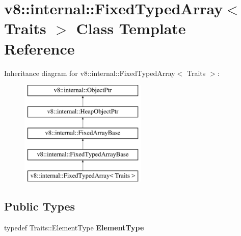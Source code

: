 \hypertarget{classv8_1_1internal_1_1FixedTypedArray}{}\section{v8\+:\+:internal\+:\+:Fixed\+Typed\+Array$<$ Traits $>$ Class Template Reference}
\label{classv8_1_1internal_1_1FixedTypedArray}
Inheritance diagram for v8\+:\+:internal\+:\+:Fixed\+Typed\+Array$<$ Traits $>$\+:\begin{figure}[H]
\begin{center}
\leavevmode
\includegraphics[height=5.000000cm]{classv8_1_1internal_1_1FixedTypedArray}
\end{center}
\end{figure}
\subsection*{Public Types}
\begin{DoxyCompactItemize}
\item 
\mbox{\label{classv8_1_1internal_1_1FixedTypedArray_afa6365d991229911088bf53ea95efb70}} 
typedef Traits\+::\+Element\+Type {\bfseries Element\+Type}
\end{DoxyCompactItemize}
